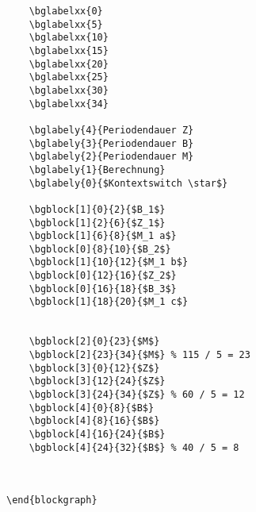 \documentclass[a4paper,11pt]{article}
\begin{document}
\begin{enumerate}
\begin{itemize}
\begin{lstlisting}
    \bglabelxx{0}
    \bglabelxx{5}
    \bglabelxx{10}
    \bglabelxx{15}
    \bglabelxx{20}
    \bglabelxx{25}
    \bglabelxx{30}
    \bglabelxx{34}

    \bglabely{4}{Periodendauer Z}
    \bglabely{3}{Periodendauer B}
    \bglabely{2}{Periodendauer M}
    \bglabely{1}{Berechnung}
    \bglabely{0}{$Kontextswitch \star$}

    \bgblock[1]{0}{2}{$B_1$}
    \bgblock[1]{2}{6}{$Z_1$}
    \bgblock[1]{6}{8}{$M_1 a$}
    \bgblock[0]{8}{10}{$B_2$}
    \bgblock[1]{10}{12}{$M_1 b$}
    \bgblock[0]{12}{16}{$Z_2$}
    \bgblock[0]{16}{18}{$B_3$}
    \bgblock[1]{18}{20}{$M_1 c$}


    \bgblock[2]{0}{23}{$M$}
    \bgblock[2]{23}{34}{$M$} % 115 / 5 = 23
    \bgblock[3]{0}{12}{$Z$}
    \bgblock[3]{12}{24}{$Z$}
    \bgblock[3]{24}{34}{$Z$} % 60 / 5 = 12
    \bgblock[4]{0}{8}{$B$}
    \bgblock[4]{8}{16}{$B$}
    \bgblock[4]{16}{24}{$B$}
    \bgblock[4]{24}{32}{$B$} % 40 / 5 = 8



\end{blockgraph}
\end{lstlisting}
\end{itemize}

\end{enumerate}
\end{document}
